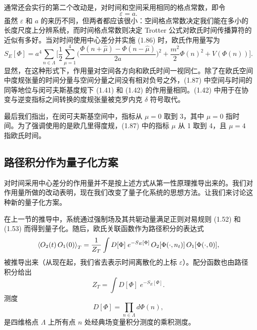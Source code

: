 通常还会实行的第二个改动是，对时间和空间采用相同的格点常数，即令
\begin{equation}
  \varepsilon = a.
\end{equation}
虽然 $\varepsilon$ 和 $a$ 的来历不同，但两者都应该很小：空间格点常数决定我们能在多小的长度尺度上分辨系统，而时间格点常数则决定 Trotter 公式对欧氏时间传播算符的近似有多好。当对时间使用中心差分并实施 (1.86) 时，欧氏作用量写为
\begin{equation}
  S_E[\Phi] = a^4\sum_{n\in\Lambda}\Big[
    \frac{1}{2}\sum_{\mu=1}^4
      \Big(\frac{\Phi(n+\hat{\mu}) - \Phi(n-\hat{\mu})}{2a}\Big)^2
    + \frac{m^2}{2}\Phi(n)^2 + V(\Phi(n))\Big].
\end{equation}
显然，在这种形式下，作用量对空间各方向和欧氏时间一视同仁。除了在欧氏空间中度规张量的时间分量与空间分量之间没有相对负号之外，(1.87) 中空间与时间的同等地位与闵可夫斯基度规下 (1.41) 和 (1.42) 的作用量相同。(1.42) 中用于在协变与逆变指标之间转换的度规张量被克罗内克 $\delta$ 符号取代。

最后我们指出，在闵可夫斯基空间中，指标从 $\mu = 0$ 取到 3，其中 $\mu = 0$ 指时间。为了强调使用的是欧几里得度规，(1.87) 中的指标 $\mu$ 从 1 取到 4，且 $\mu = 4$ 指欧氏时间。

\subsection{路径积分作为量子化方案}

对时间采用中心差分的作用量并不是按上述方式从第一性原理推导出来的。我们对作用量所做的改动表明，现在我们改变了量子化系统的思想方法。让我们来讨论这种新的量子化方案。

在上一节的推导中，系统通过强制场及其共轭动量满足正则对易规则 (1.52) 和 (1.53) 而得到量子化。随后，欧氏关联函数作为路径积分的表达式
\begin{equation}
  \left\langle O_2(t)\,O_1(0) \right\rangle_T = \frac{1}{Z_T}\int D[\Phi]\;e^{-S_E[\Phi]}\,
    O_2[\Phi(\cdot,n_t)]\,O_1[\Phi(\cdot,0)],
\end{equation}
被推导出来（从现在起，我们省去表示时间离散化的上标 $\varepsilon$）。配分函数也由路径积分给出
\begin{equation}
  Z_T = \int D[\Phi]\;e^{-S_E[\Phi]}.
\end{equation}
测度
\begin{equation}
  D[\Phi] = \prod_{n\in\Lambda}d\Phi(n),
\end{equation}
是四维格点 $\Lambda$ 上所有点 $n$ 处经典场变量积分测度的乘积测度。

